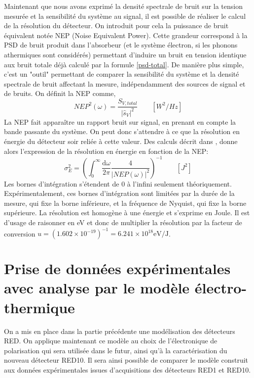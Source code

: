 Maintenant que nous avons exprimé la densité spectrale de bruit sur la tension mesurée et la sensibilité du système au signal, il est possible de réaliser le calcul de la résolution du détecteur. On introduit pour cela la puissance de bruit équivalent notée NEP (Noise Equivalent Power). Cette grandeur correspond à la PSD de bruit produit dans l'absorbeur (et le système électron, si les phonons athermiques sont considérés) permettant d'induire un bruit en tension identique aux bruit totale déjà calculé par la formule \ref{psd-total}. De manière plus simple, c'est un "outil" permettant de comparer la sensibilité du système et la densité spectrale de bruit affectant la mesure, indépendamment des sources de signal et de bruits. On définit la NEP comme,
\begin{equation}
\label{nep}
NEP^2(\omega) =  \frac{S_{V,total}}{|\hat{s}_V|^2} \qquad [W^2/Hz]
\end{equation}
La NEP fait apparaître un rapport bruit sur signal, en prenant en compte la bande passante du système. On peut donc s'attendre à ce que la résolution en énergie du détecteur soir reliée à cette valeur. Des calculs décrit dans \cite{cpd}, donne alors l'expression de la résolution en énergie en fonction de la NEP:
\begin{equation}
\label{resolution}
\displaystyle{ \sigma_E^2 = \left( \int_{0}^{\infty} \frac{\mathrm{d}\omega}{2\pi}\frac{4}{|NEP(\omega)|^2}\right)^{-1} } \qquad [J^2]
\end{equation}
Les bornes d'intégration s'étendent de $0$ à l'infini seulement théoriquement. Expérimentalement, ces bornes d'intégration sont limitées par la durée de la mesure, qui fixe la borne inférieure, et la fréquence de Nyquist, qui fixe la borne supérieure. La résolution est homogène à une énergie et s'exprime en Joule. Il est d'usage de raisonner en eV et donc de multiplier la résolution par la facteur de conversion $u=(1.602\times 10^{-19})^{-1}  = 6.241 \times 10^{18} \textrm{eV/J}$.

\section{Prise de données expérimentales avec analyse par le modèle électro-thermique}

On a mis en place dans la partie précédente une modélisation des détecteurs RED. On applique maintenant ce modèle au choix de l'électronique de polarisation qui sera utilisée dans le futur, ainsi qu'à la caractérisation du nouveau détecteur RED10. Il sera ainsi possible de comparer le modèle construit aux données expérimentales issues d'acquisitions des détecteurs RED1 et RED10.

